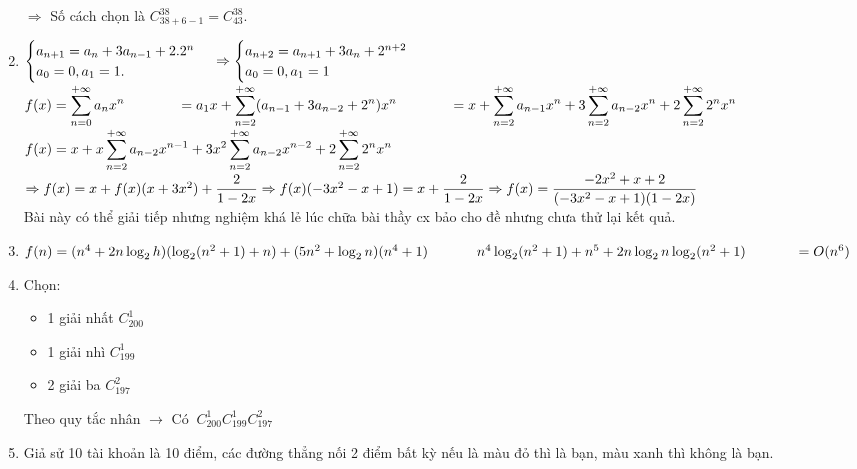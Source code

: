 \documentclass[12pt,oneside]{book}
\begin{document}
\begin{enumerate}[label = {\bf Câu \arabic*.}]
\begin{center}
	\end{center}
	$\Rightarrow$ Số cách chọn là $C_{38+6-1}^{38}=C_{43}^{38}.$
	\item 
	$\begin{cases}
		a_{n+1}=a_n+3a_{n-1}+2.2^n\\
		a_0 = 0, a_1 = 1.
	\end{cases}
	\\
	\Rightarrow \begin{cases}
		a_{n+2} = a_{n+1} + 3a_{n} +2^{n+2}\\
		a_0 = 0, a_1 = 1
	\end{cases}$
	\\$ f(x) = \displaystyle \sum_{n = 0}^{+\infty} a_nx^n
	\\ \indent\hspace{0.8cm} = a_1x+ \displaystyle\sum_{n=2}^{+\infty}(a_{n-1}+3a_{n-2}+2^n)x^n
	\\ \indent\hspace{0.8cm} = x+\displaystyle\sum_{n=2}^{+\infty}a_{n-1}x^n+ 3\displaystyle \sum_{n = 2}^{+\infty} a_{n-2}x^n + 2\displaystyle \sum_{n=2}^{+\infty} 2^nx^n$
	$ \\ f(x) = x + x\displaystyle \sum_{n=2}^{+\infty} a_{n-2}x^{n-1} + 3x^2\displaystyle \sum_{n=2}^{+\infty} a_{n-2} x^{n-2} + 2\displaystyle \sum_{n=2}^{+\infty} 2^nx^n$\\
	$\Rightarrow f(x) = x +f(x)(x+3x^2)+\dfrac{2}{1-2x}\\
	\Rightarrow f(x)(-3x^2-x+1)=x+\dfrac{2}{1-2x}\\
	\Rightarrow f(x) = \dfrac{-2x^2+x+2}{(-3x^2-x+1)(1-2x)}$ 
	\\ Bài này có thể giải tiếp nhưng nghiệm khá lẻ lúc chữa bài thầy cx bảo cho đề nhưng chưa thử lại kết quả.
	\item 
	$f(n) = (n^4+2n\log_2h)(\log_2(n^2+1)+n) + (5n^2+ \log_2n)(n^4+1)\\
	\indent\hspace{0.7cm} n^4\log_2(n^2+1)+n^5+2n\log_2n\log_2(n^2+1)
	\indent\hspace{0.7cm} = O(n^6)$
	\item Chọn:\begin{itemize}
		\item[] 1 giải nhất $C^1_{200}$
		\item[] 1 giải nhì $C^1_{199}$
		\item[] 2 giải ba $C^2_{197}$
	\end{itemize}
	Theo quy tắc nhân $\rightarrow$ Có $\medspace C^1_{200}C^1_{199}C^2_{197}$
	\item \indent\hspace{1cm} Giả sử 10 tài khoản là 10 điểm, các đường thẳng nối 2 điểm bất kỳ nếu là màu đỏ thì là bạn, màu xanh thì không là bạn.\\

\end{enumerate}
\end{document}
